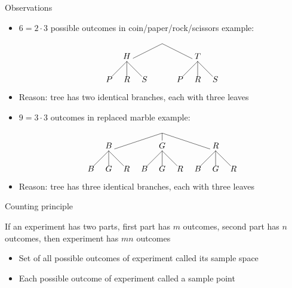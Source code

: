 \documentclass[handout]{beamer}
\theoremstyle{definition}
\begin{document}
\begin{frame}{Observations}
\begin{itemize}
\item $6=2\cdot 3$ possible outcomes in coin/paper/rock/scissors example:
\[\begin{xy}<.75cm,0cm>:
(0,0)="0";
(-2,-1)="-21";
(2,-1)="21";
"0";"-21"*+!D{H}**\dir{-};
"0";"21"*+!D{T}**\dir{-};
"-21";(-3,-2)*{P}**\dir{-};
"-21";(-2,-2)*{R}**\dir{-};
"-21";(-1,-2)*{S}**\dir{-};
"21";(1,-2)*{P}**\dir{-};
"21";(2,-2)*{R}**\dir{-};
"21";(3,-2)*{S}**\dir{-};
\end{xy}\]
\item Reason: tree has two \alert{identical} branches, each with three leaves
\item $9=3\cdot 3$ outcomes in replaced marble example:
\[\begin{xy}<.75cm,0cm>:
(0,0)="0";
(-3,-1)="-31";
(0,-1)="01";
(3,-1)="31";
"0";"-31"*+!D{B}**\dir{-};
"0";"01"*+!D{G}**\dir{-};
"0";"31"*+!D{R}**\dir{-};
"-31";(-4,-2)*{B}**\dir{-};
"-31";(-3,-2)*{G}**\dir{-};
"-31";(-2,-2)*{R}**\dir{-};
"01";(-1,-2)*{B}**\dir{-};
"01";(0,-2)*{G}**\dir{-};
"01";(1,-2)*{R}**\dir{-};
"31";(2,-2)*{B}**\dir{-};
"31";(3,-2)*{G}**\dir{-};
"31";(4,-2)*{R}**\dir{-};
\end{xy}\]
\item Reason: tree has three \alert{identical} branches,
each with three leaves
\end{itemize}
\end{frame}

\begin{frame}{Counting principle}
\begin{lemma}
If an experiment has two parts, first
part has $m$ outcomes, second part
has $n$ outcomes, then experiment
has $mn$ outcomes
\end{lemma}
\begin{definition}
\begin{itemize}
\item Set of all possible outcomes of experiment called
its \alert{sample space}
\item Each possible outcome of experiment called
a \alert{sample point}
\end{itemize}
\end{definition}
\end{frame}
\end{document}
